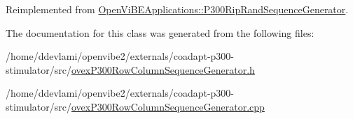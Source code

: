 Reimplemented from \hyperlink{classOpenViBEApplications_1_1P300RipRandSequenceGenerator_abf8dc29b3de5ffa47383ef0005dc77c8}{OpenViBEApplications::P300RipRandSequenceGenerator}.



The documentation for this class was generated from the following files:\begin{DoxyCompactItemize}
\item 
/home/ddevlami/openvibe2/externals/coadapt-\/p300-\/stimulator/src/\hyperlink{ovexP300RowColumnSequenceGenerator_8h}{ovexP300RowColumnSequenceGenerator.h}\item 
/home/ddevlami/openvibe2/externals/coadapt-\/p300-\/stimulator/src/\hyperlink{ovexP300RowColumnSequenceGenerator_8cpp}{ovexP300RowColumnSequenceGenerator.cpp}\end{DoxyCompactItemize}
